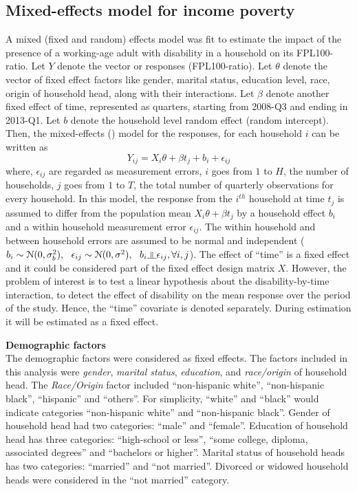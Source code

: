 \documentclass[11pt]{extarticle} %
\begin{document}
\subsection{Mixed-effects model for income poverty}
A mixed (fixed and random) effects model was fit to estimate the impact of the presence of a working-age adult with disability in a household on its FPL100-ratio. Let $Y$ denote the vector or responses (FPL100-ratio). Let $\theta$ denote the vector of fixed effect factors like gender, marital status, education level, race, origin of household head, along with their interactions. Let $\beta$ denote another fixed effect of time, represented as quarters, starting from 2008-Q3 and ending in 2013-Q1. Let $b$ denote the household level random effect (random intercept). Then, the mixed-effects (\cite{Fitzmaurice_2012_Applied}) model for the responses, for each household $i$ can be written as
\begin{equation}
Y_{ij} = X_i\theta + \beta t_j + b_i + \epsilon_{ij}
\label{eq:MixedEffects1}
\end{equation}
where, $\epsilon_{ij}$ are regarded as measurement errors, $i$ goes from $1$ to $H$, the number of households, $j$ goes from $1$ to $T$, the total number of quarterly observations for every household. In this model, the response from the $i^{th}$ household at time $t_j$ is assumed to differ from the population mean $X_i\theta + \beta t_j$ by a household effect $b_i$ and a within household measurement error $\epsilon_{ij}$. The within household and between household errors are assumed to be normal and independent ($b_i \sim \N(0, \sigma^2_b),\ \ \epsilon_{ij} \sim \N(0, \sigma^2), \ \ b_i \indep \epsilon_{ij}, \forall i, j$). The effect of ``time'' is a fixed effect and it could be considered part of the fixed effect design matrix $X$. However, the problem of interest is to test a linear hypothesis about the disability-by-time interaction, to detect the effect of disability on the mean response over the period of the study. Hence, the ``time'' covariate is denoted separately. During estimation it will be estimated as a fixed effect. 

\noindent
{\bf{Demographic factors}}\\
The demographic factors were considered as fixed effects. The factors included in this analysis were {\emph{gender}}, {\emph{marital status}}, {\emph{education}}, and {\emph{race/origin}} of household head. The {\emph{Race/Origin}} factor included ``non-hispanic white'', ``non-hispanic black'', ``hispanic'' and ``others''. For simplicity, ``white'' and ``black'' would indicate categories ``non-hispanic white'' and ``non-hispanic black''. Gender of household head had two categories: ``male'' and ``female''. Education of household head has three categories: ``high-school or less'', ``some college, diploma, associated degrees'' and ``bachelors or higher''. Marital status of household heads has two categories: ``married'' and ``not married''. Divorced or widowed household heads were considered in the ``not married'' category. 
\end{document}

